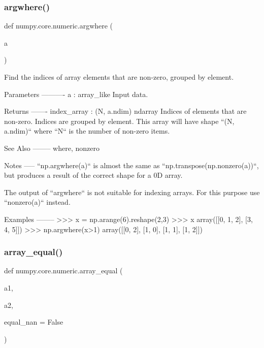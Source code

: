  \mbox{\label{namespacenumpy_1_1core_1_1numeric_a1b1ea621ebdf27d454d7d9887c68f67a}} 
\subsubsection{\texorpdfstring{argwhere()}{argwhere()}}
{\footnotesize\ttfamily def numpy.\+core.\+numeric.\+argwhere (\begin{DoxyParamCaption}\item[{}]{a }\end{DoxyParamCaption})}

\begin{DoxyVerb}Find the indices of array elements that are non-zero, grouped by element.

Parameters
----------
a : array_like
    Input data.

Returns
-------
index_array : (N, a.ndim) ndarray
    Indices of elements that are non-zero. Indices are grouped by element.
    This array will have shape ``(N, a.ndim)`` where ``N`` is the number of
    non-zero items.

See Also
--------
where, nonzero

Notes
-----
``np.argwhere(a)`` is almost the same as ``np.transpose(np.nonzero(a))``,
but produces a result of the correct shape for a 0D array.

The output of ``argwhere`` is not suitable for indexing arrays.
For this purpose use ``nonzero(a)`` instead.

Examples
--------
>>> x = np.arange(6).reshape(2,3)
>>> x
array([[0, 1, 2],
       [3, 4, 5]])
>>> np.argwhere(x>1)
array([[0, 2],
       [1, 0],
       [1, 1],
       [1, 2]])\end{DoxyVerb}
 \mbox{\label{namespacenumpy_1_1core_1_1numeric_a2db68b636ed03415538dd11c25adbc6a}} 
\subsubsection{\texorpdfstring{array\+\_\+equal()}{array\_equal()}}
{\footnotesize\ttfamily def numpy.\+core.\+numeric.\+array\+\_\+equal (\begin{DoxyParamCaption}\item[{}]{a1,  }\item[{}]{a2,  }\item[{}]{equal\+\_\+nan = {\ttfamily False} }\end{DoxyParamCaption})}

